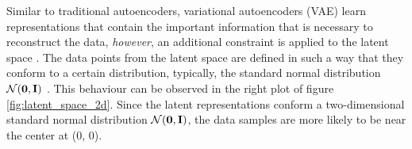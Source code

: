 Similar to traditional autoencoders, variational autoencoders (VAE) learn representations that contain the important information that is necessary to reconstruct the data, \textit{however}, an additional constraint is applied to the latent space \cite{doerschTutorialVariationalAutoencoders2021, davidfosterVariationalAutoencoders2023, kingmaAutoEncodingVariationalBayes2022, kingmaIntroductionVariationalAutoencoders2019}. The data points from the latent space are defined in such a way that they conform to a certain distribution, typically, the standard normal distribution $\mathcal{N}(\bm{\mathbf{0}}, \mathbf{I})$ \cite{davidfosterVariationalAutoencoders2023}. %
This behaviour can be observed in the right plot of figure \ref{fig:latent_space_2d}. Since the latent representations conform a two-dimensional standard normal distribution $\mathcal{N}(\bm{\mathbf{0}}, \mathbf{I})$, the data samples are more likely to be near the center at (0, 0).


%
%






